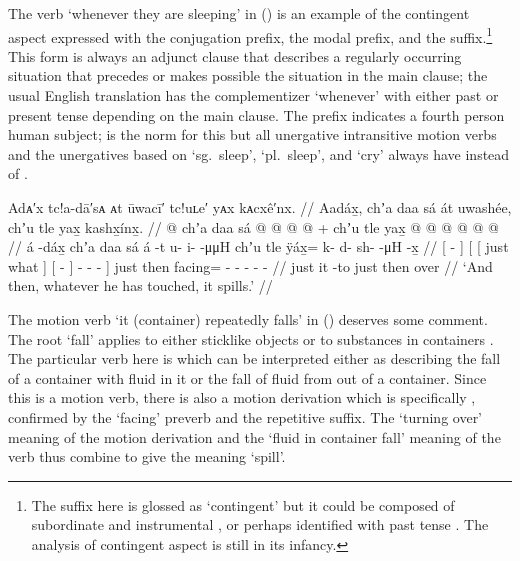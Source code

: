 The verb  ‘whenever they are sleeping’ in (\lastx) is an example of the contingent aspect expressed with the  conjugation prefix, the  modal prefix, and the  suffix.\footnote{The  suffix here is glossed as ‘contingent’ but it could be composed of subordinate  and instrumental , or perhaps identified with past tense .
The analysis of contingent aspect is still in its infancy.} This form is always an adjunct clause that describes a regularly occurring situation that precedes or makes possible the situation in the main clause; the usual English translation has the complementizer ‘whenever’ with either past or present tense depending on the main clause.
The  prefix indicates a fourth person human subject;  is the norm for this but all unergative intransitive motion verbs and the unergatives based on  ‘sg.\ sleep’,  ‘pl.\ sleep’, and  ‘cry’ always have  instead of .

\ex\label{ex:106-16-touch-spill}%
%
\begingl
	\glpreamble	Adᴀ′x tc!a-dā′sᴀ ᴀt ūwacī′ tc!uʟe′ yᴀx kᴀcxê′nx. //
	\glpreamble	Aadáx̱, chʼa daa sá át uwashée, chʼu tle yax̱ kashx̱ínx̱. //
	\gla	{}  @ {} {}
			{} {} chʼa daa sá {}
				{}  @ {} {}
				 @ {} @ {} @ {} {} +
		chʼu tle yax̱ @  @ {} @ {} @ {} @ {} @ {} //
	\glb	{} á -dáx̱ {}
			{} {} chʼa daa sá {}
			{} á -t {}
			u- i-  -μμH {}
		chʼu tle ÿáx̱= k- d- sh-  -μH -x̱ //
	\glc	{}[  - {}]
			{}[ {}[ just what  {}]
			{}[  - {}]
			- -  - {}]
		just then facing= - - -  - - //
	\gld	{}  {} {}
			{} {} just  {} {}
			{} it -to {}
			 {} {} {} {}
		just then over  {} {} {} {} {} //
	\glft	‘And then, whatever he has touched, it spills.’
		//
\endgl
\xe

The motion verb  ‘it (container) repeatedly falls’ in (\lastx) deserves some comment.
The root  ‘fall’ applies to either sticklike objects or to substances in containers \parencite[f02/28–30]{leer:1973}.
The particular verb here is  \parencite[796]{leer:1976} which can be interpreted either as describing the fall of a container with fluid in it or the fall of fluid from out of a container.
Since this is a motion verb, there is also a motion derivation which is specifically , confirmed by the  ‘facing’ preverb and the  repetitive suffix.
The ‘turning over’ meaning of the motion derivation and the ‘fluid in container fall’ meaning of the verb thus combine to give the meaning ‘spill’.

